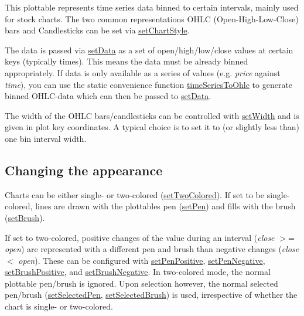 This plottable represents time series data binned to certain intervals, mainly used for stock charts. The two common representations O\+H\+L\+C (Open-\/\+High-\/\+Low-\/\+Close) bars and Candlesticks can be set via \hyperlink{class_q_c_p_financial_a5a59175d36279d71596e64d7bb65596f}{set\+Chart\+Style}.

The data is passed via \hyperlink{class_q_c_p_financial_adf12a86082f1e488df6a4e8603f8fd6d}{set\+Data} as a set of open/high/low/close values at certain keys (typically times). This means the data must be already binned appropriately. If data is only available as a series of values (e.\+g. {\itshape price} against {\itshape time}), you can use the static convenience function \hyperlink{class_q_c_p_financial_a0c3453d1c03e320950fdd2df54e3ebc8}{time\+Series\+To\+Ohlc} to generate binned O\+H\+L\+C-\/data which can then be passed to \hyperlink{class_q_c_p_financial_adf12a86082f1e488df6a4e8603f8fd6d}{set\+Data}.

The width of the O\+H\+L\+C bars/candlesticks can be controlled with \hyperlink{class_q_c_p_financial_a99633f8bac86a61d534ae5eeb1a3068f}{set\+Width} and is given in plot key coordinates. A typical choice is to set it to (or slightly less than) one bin interval width.\hypertarget{class_q_c_p_statistical_box_appearance}{}\subsection{Changing the appearance}\label{class_q_c_p_statistical_box_appearance}
Charts can be either single-\/ or two-\/colored (\hyperlink{class_q_c_p_financial_a138e44aac160a17a9676652e240c5f08}{set\+Two\+Colored}). If set to be single-\/colored, lines are drawn with the plottable\textquotesingle{}s pen (\hyperlink{class_q_c_p_abstract_plottable_ab74b09ae4c0e7e13142fe4b5bf46cac7}{set\+Pen}) and fills with the brush (\hyperlink{class_q_c_p_abstract_plottable_a7a4b92144dca6453a1f0f210e27edc74}{set\+Brush}).

If set to two-\/colored, positive changes of the value during an interval ({\itshape close} $>$= {\itshape open}) are represented with a different pen and brush than negative changes ({\itshape close} $<$ {\itshape open}). These can be configured with \hyperlink{class_q_c_p_financial_ac58aa3adc7a35aab0088764b840683e5}{set\+Pen\+Positive}, \hyperlink{class_q_c_p_financial_afe5c07e94ccea01a75b3a2476993c346}{set\+Pen\+Negative}, \hyperlink{class_q_c_p_financial_a5ebff2b1764efd07cc44942e67821829}{set\+Brush\+Positive}, and \hyperlink{class_q_c_p_financial_a8bbdd87629f9144b3ef51af660c0961a}{set\+Brush\+Negative}. In two-\/colored mode, the normal plottable pen/brush is ignored. Upon selection however, the normal selected pen/brush (\hyperlink{class_q_c_p_abstract_plottable_a6911603cad23ab0469b108224517516f}{set\+Selected\+Pen}, \hyperlink{class_q_c_p_abstract_plottable_ae8c816874089f7a44001e8618e81a9dc}{set\+Selected\+Brush}) is used, irrespective of whether the chart is single-\/ or two-\/colored. 

